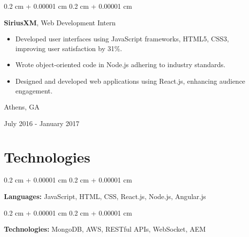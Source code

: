 \documentclass[10pt, letterpaper]{article}
\newenvironment{highlights}{
    \begin{itemize}[
        topsep=0.10 cm,
        parsep=0.10 cm,
        partopsep=0pt,
        itemsep=0pt,
        leftmargin=0.4 cm + 10pt
    ]
}{
    \end{itemize}
} %
\newenvironment{onecolentry}{
    \begin{adjustwidth}{
        0.2 cm + 0.00001 cm
    }{
        0.2 cm + 0.00001 cm
    }
}{
    \end{adjustwidth}
} %
\newenvironment{twocolentry}[2][]{
    \onecolentry
    \def\secondColumn{#2}
    \setcolumnwidth{\fill, 4.5 cm}
    \begin{paracol}{2}
}{
    \switchcolumn \raggedleft \secondColumn
    \end{paracol}
    \endonecolentry
} %
\begin{document}
    \begin{twocolentry}{
        Athens, GA

        July 2016 - January 2017
    }
        \textbf{SiriusXM}, Web Development Intern
        \begin{highlights}
            \item Developed user interfaces using JavaScript frameworks, HTML5, CSS3, improving user satisfaction by 31\%.
            \item Wrote object-oriented code in Node.js adhering to industry standards.
            \item Designed and developed web applications using React.js, enhancing audience engagement.
        \end{highlights}
    \end{twocolentry}

    \section{Technologies}

    \begin{onecolentry}
        \textbf{Languages:} JavaScript, HTML, CSS, React.js, Node.js, Angular.js
    \end{onecolentry}

    \vspace{0.2 cm}

    \begin{onecolentry}
        \textbf{Technologies:} MongoDB, AWS, RESTful APIs, WebSocket, AEM
    \end{onecolentry}
\end{document}

